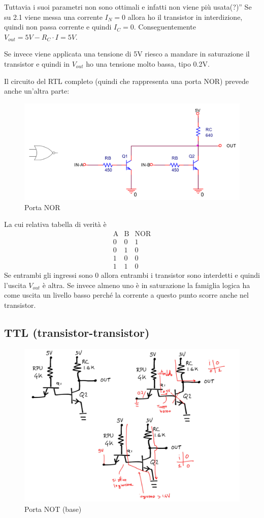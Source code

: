 \documentclass[
]{book}
\begin{document}
Tuttavia i suoi parametri non sono ottimali e infatti non viene più
usata(?)'' Se su 2.1 viene messa una corrente \(I_{N}=0\) allora ho il
transistor in interdizione, quindi non passa corrente e quindi
\(I_{C}=0\). Conseguentemente \(V_{out}=5V-R_{C}\cdot I=5V\).

Se invece viene applicata una tensione di 5V riesco a mandare in
saturazione il transistor e quindi in \(V_{out}\) ho una tensione molto
bassa, tipo 0.2V.

Il circuito del RTL completo (quindi che rappresenta una porta NOR)
prevede anche un'altra parte:

\begin{figure}
\centering
\includegraphics[width=0.45\linewidth,height=\textheight,keepaspectratio]{immagini/19.png}
\caption{Porta NOR}
\end{figure}

La cui relativa tabella di verità è \[
\begin{array}{cc|c}\text{A}&\text{B}&\text{NOR}\\\hline0&0&1\\0&1&0\\1&0&0\\1&1&0\end{array}
\] Se entrambi gli ingressi sono 0 allora entrambi i transistor sono
interdetti e quindi l'uscita \(V_{out}\) è altra. Se invece almeno uno è
in saturazione la famiglia logica ha come uscita un livello basso perché
la corrente a questo punto scorre anche nel transistor.

\subsection{TTL
(transistor-transistor)}\label{ttl-transistor-transistor}

\begin{figure}
\centering
\includegraphics[width=0.5\linewidth,height=\textheight,keepaspectratio]{immagini/20.jpg}
\caption{Porta NOT (base)}
\end{figure}
\end{document}

